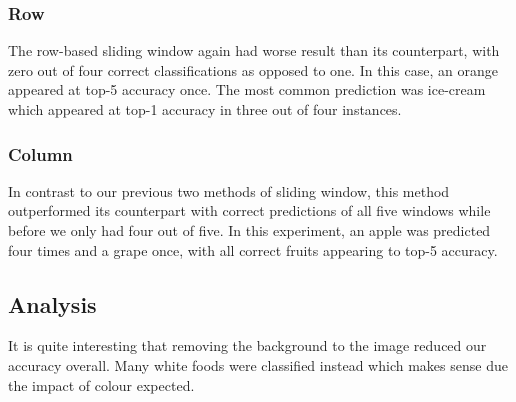 \subsubsection*{Row}
The row-based sliding window again had worse result than its counterpart, with
zero out of four correct classifications as opposed to one. In this case, an
orange appeared at top-5 accuracy once. The most common prediction was ice-cream
which appeared at top-1 accuracy in three out of four instances.

\subsubsection*{Column}
In contrast to our previous two methods of sliding window, this method
outperformed its counterpart with correct predictions of all five windows while
before we only had four out of five. In this experiment, an apple was predicted
four times and a grape once, with all correct fruits appearing to top-5
accuracy.

\subsection*{Analysis}
It is quite interesting that removing the background to the image reduced our
accuracy overall. Many white foods were classified instead which makes sense due
the impact of colour expected.
